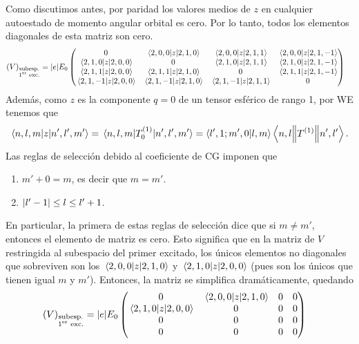 \documentclass[10pt, a4paper]{article}
\numberwithin{equation}{subsection}
\begin{document}
Como discutimos antes, por paridad los valores medios de $z$ en cualquier
autoestado de momento angular orbital es cero. Por lo tanto, todos los
elementos diagonales de esta matriz son cero.
\begin{align}
  (V)_{\substack{\text{subesp.}\\1^{\text{er}}\text{ exc.}}}
  &= \abs{e}E_0 \begin{pmatrix}
    0 & \matrixel{2,0,0}{z}{2,1,0} &
    \matrixel{2,0,0}{z}{2,1,1} & \matrixel{2,0,0}{z}{2,1,-1} \\
    \matrixel{2,1,0}{z}{2,0,0} & 0 &
    \matrixel{2,1,0}{z}{2,1,1} & \matrixel{2,1,0}{z}{2,1,-1} \\
    \matrixel{2,1,1}{z}{2,0,0} & \matrixel{2,1,1}{z}{2,1,0} &
    0 & \matrixel{2,1,1}{z}{2,1,-1} \\
    \matrixel{2,1,-1}{z}{2,0,0} & \matrixel{2,1,-1}{z}{2,1,0} &
    \matrixel{2,1,-1}{z}{2,1,1} & 0
  \end{pmatrix}
\end{align}
Además, como $z$ es la componente $q = 0$ de un tensor esférico de rango 1, por
WE tenemos que
\begin{equation}
  \matrixel{n,l,m}{z}{n',l',m'}
  = \matrixel{n,l,m}{T^{(1)}_{0}}{n',l',m'}
  = \braket{l',1;m',0}{l,m} \doublebarmel{n,l}{T^{(1)}}{n',l'}.
\end{equation}
Las reglas de selección debido al coeficiente de CG imponen que
\begin{enumerate}
  \item $m' + 0 = m$, es decir que $m = m'$.
  \item $\abs{l'-1} \leq l \leq l'+1$.
\end{enumerate}
En particular, la primera de estas reglas de selección dice que si $m \neq m'$,
entonces el elemento de matriz es cero. Esto significa que en la matriz de $V$
restringida al subespacio del primer excitado, los únicos elementos no
diagonales que sobreviven son los $\matrixel{2,0,0}{z}{2,1,0}$ y
$\matrixel{2,1,0}{z}{2,0,0}$ (pues son los únicos que tienen igual $m$ y $m'$).
Entonces, la matriz se simplifica dramáticamente, quedando
\begin{align}
  (V)_{\substack{\text{subesp.}\\1^{\text{er}}\text{ exc.}}}
  &= \abs{e}E_0 \begin{pmatrix}
    0 & \matrixel{2,0,0}{z}{2,1,0} &
    0 & 0 \\
    \matrixel{2,1,0}{z}{2,0,0} & 0 &
    0 & 0 \\
    0 & 0 &
    0 & 0 \\
    0 & 0 &
    0 & 0
  \end{pmatrix}
\end{align}
\end{document}
